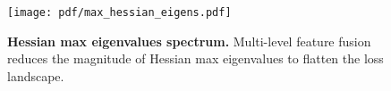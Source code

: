 \begin{figure}[t!]
\centering
\texttt{[image: pdf/max\_hessian\_eigens.pdf]}
\caption{\textbf{Hessian max eigenvalues spectrum.} Multi-level feature fusion reduces the magnitude of Hessian max eigenvalues to flatten the loss landscape.}
\label{fig:optim_eigen}
\end{figure}
